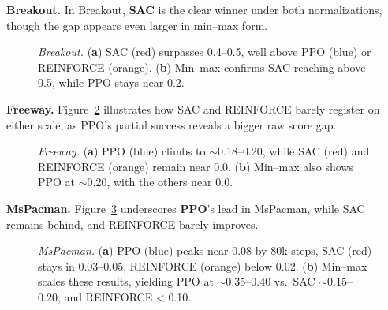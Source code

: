 \medskip

\noindent \textbf{Breakout.} In Breakout, \textbf{SAC} is the clear winner under both normalizations, though the gap appears even larger in min--max form.
\begin{figure} 
	\centering
	\quad
	\caption{\emph{Breakout.}
		(\textbf{a}) SAC (red) surpasses 0.4--0.5, well above PPO (blue) or REINFORCE (orange).
		(\textbf{b}) Min--max confirms SAC reaching above 0.5, while PPO stays near 0.2.}
	\label{fig:breakout_combined}
\end{figure}

\medskip

\noindent \textbf{Freeway.} Figure~\ref{fig:freeway_combined} illustrates how SAC and REINFORCE barely register on either scale, as PPO's partial success reveals a bigger raw score gap.
\begin{figure} 
	\centering
	\quad
	\caption{\emph{Freeway.}
		(\textbf{a}) PPO (blue) climbs to $\sim$\num{0.18}--\num{0.20}, while SAC (red) and REINFORCE (orange) remain near 0.0.
		(\textbf{b}) Min--max also shows PPO at $\sim$\num{0.20}, with the others near 0.0.}
	\label{fig:freeway_combined}
\end{figure}



\medskip

\noindent \textbf{MsPacman.} Figure~\ref{fig:mspacman_combined} underscores \textbf{PPO}'s lead in MsPacman, while SAC remains behind, and REINFORCE barely improves.
\begin{figure} 
	\centering
	\quad
	\caption{\emph{MsPacman.}
		(\textbf{a}) PPO (blue) peaks near 0.08 by 80k steps, SAC (red) stays in 0.03--0.05, REINFORCE (orange) below 0.02.
		(\textbf{b}) Min--max scales these results, yielding PPO at $\sim$\num{0.35}--\num{0.40} vs.\ SAC $\sim$\num{0.15}--\num{0.20}, and REINFORCE < 0.10.}
	\label{fig:mspacman_combined}
\end{figure}



